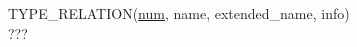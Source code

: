 \documentclass[a4paper,11pt,french]{article}
\begin{document}
TYPE\_RELATION(\underline{num}, name, extended\_name, info) \\

???




\end{document}
